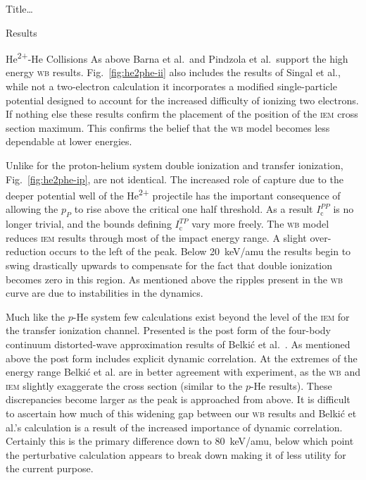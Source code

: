 \documentclass[letterpaper, 11 pt]{report}
\begin{document}
\begin{chapter}{ Title\dots \label{chap:p-he2p-he}}
\begin{section}{Results \label{sec:phe2p-res}}
\begin{subsection}{\texorpdfstring{He\textsuperscript{2+}}{He2+}-He Collisions 
                         \label{sec:he2phe-res}}
         As above Barna et al.\ and Pindzola et al.\ support the high energy \textsc{wb}
         results. Fig.~\ref{fig:he2phe-ii} also includes the results of Singal et al., while
         not a two-electron calculation it incorporates a modified single-particle potential designed to
         account for the increased difficulty of ionizing two electrons. If nothing else these results
         confirm the placement of the position of the \textsc{iem} cross section maximum. This confirms
         the belief that the \textsc{wb} model becomes less dependable at lower energies.

         Unlike for the proton-helium system double ionization and transfer ionization,
         Fig.~\ref{fig:he2phe-ip}, are not identical. The increased role of capture due to the deeper
         potential well of the He\textsuperscript{2+} projectile has the important consequence of
         allowing the $p_P$ to rise above the critical one half threshold. As a result
         $I^{PP}_\mathrm{c}$ is no longer trivial, and the bounds defining $I^{TP}_\mathrm{c}$ vary more
         freely. The \textsc{wb} model reduces \textsc{iem} results through most of the impact energy
         range. A slight over-reduction occurs to the left of the peak. Below 20~keV/amu the results
         begin to swing drastically upwards to compensate for the fact that double ionization becomes
         zero in this region. As mentioned above the ripples present in the \textsc{wb} curve are due to
         instabilities in the dynamics.

         Much like the $p$-He system few calculations exist beyond the level of the \textsc{iem} for the
         transfer ionization channel. Presented is the post form of the four-body continuum
         distorted-wave  approximation results of Belki\'{c} et al.~\cite{BMM-97}. As mentioned above
         the post form includes explicit dynamic correlation. At the extremes of the energy range
         Belki\'{c} et al. are in better agreement with experiment, as the \textsc{wb} and \textsc{iem}
         slightly exaggerate the cross section (similar to the $p$-He results). These discrepancies
         become larger as the peak is approached from above. It is difficult to ascertain how much of
         this widening gap between our \textsc{wb} results and Belki\'{c} et al.'s calculation is a
         result of the increased importance of dynamic correlation. Certainly this is the primary
         difference down to 80~keV/amu, below which point the perturbative calculation appears to break
         down making it of less utility for the current purpose.
 

\end{subsection}
\end{section}
\end{chapter}
\end{document}
